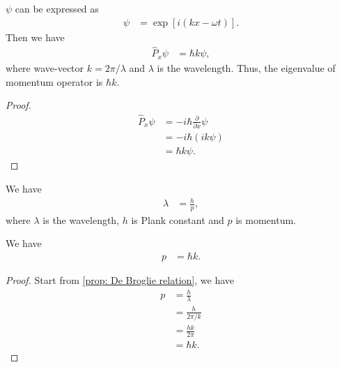 \documentclass[../../note.tex]{subfiles}
\begin{document}
 \begin{theorem}
  $\psi$ can be expressed as
  \begin{align}
    \psi
    &= \exp\left[i (kx - \omega t)\right].
  \end{align}
  Then we have
  \begin{align}
    \hat{P}_x \psi
    &= \hbar k \psi,
  \end{align}
  where wave-vector $k= 2 \pi / \lambda$ and  $\lambda$ is the wavelength. Thus, the eigenvalue of momentum operator is $\hbar k$.
 \end{theorem}
 \begin{proof}
\begin{align}
  \hat{P}_x \psi
  &= -i \hbar \frac{\partial}{\partial x} \psi \\
  &= -i \hbar (ik \psi) \\
  &= \hbar k \psi.
\end{align}
 \end{proof}

 \begin{proposition}
  \label{prop: De Broglie relation}
  We have
  \begin{align}
    \lambda
    &= \frac{h}{p},
  \end{align}
  where $\lambda$ is the wavelength, $h$ is Plank constant and $p$ is momentum.
 \end{proposition}

 \begin{corollary}
  We have 
  \begin{align}
    p
    &= \hbar k.
  \end{align}
 \end{corollary}
\begin{proof}
  Start from \ref{prop: De Broglie relation}, we have
  \begin{align}
    p
    &= \frac{h}{\lambda} \\
    &= \frac{h}{2 \pi / k} \\
    &= \frac{hk}{2 \pi} \\
    &= \hbar k.
  \end{align}
\end{proof}
\end{document}
